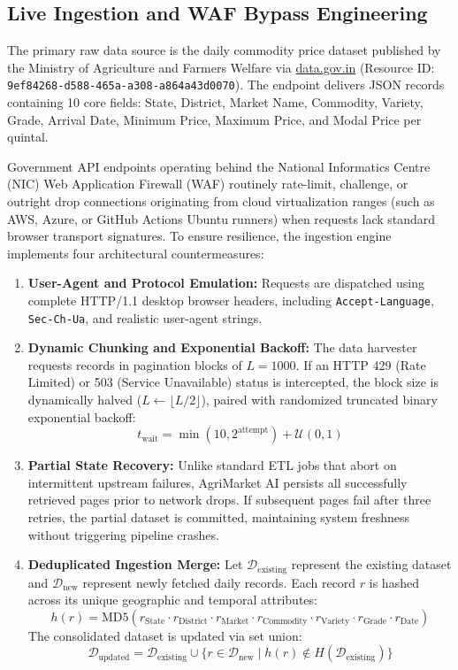 \documentclass[conference]{IEEEtran}
\begin{document}
\subsection{Live Ingestion and WAF Bypass Engineering}
The primary raw data source is the daily commodity price dataset published by the Ministry of Agriculture and Farmers Welfare via \url{data.gov.in} (Resource ID: \texttt{9ef84268-d588-465a-a308-a864a43d0070}). The endpoint delivers JSON records containing 10 core fields: State, District, Market Name, Commodity, Variety, Grade, Arrival Date, Minimum Price, Maximum Price, and Modal Price per quintal.

Government API endpoints operating behind the National Informatics Centre (NIC) Web Application Firewall (WAF) routinely rate-limit, challenge, or outright drop connections originating from cloud virtualization ranges (such as AWS, Azure, or GitHub Actions Ubuntu runners) when requests lack standard browser transport signatures. To ensure resilience, the ingestion engine implements four architectural countermeasures:
\begin{enumerate}
    \item \textbf{User-Agent and Protocol Emulation:} Requests are dispatched using complete HTTP/1.1 desktop browser headers, including \texttt{Accept-Language}, \texttt{Sec-Ch-Ua}, and realistic user-agent strings.
    \item \textbf{Dynamic Chunking and Exponential Backoff:} The data harvester requests records in pagination blocks of $L = 1000$. If an HTTP 429 (Rate Limited) or 503 (Service Unavailable) status is intercepted, the block size is dynamically halved ($L \leftarrow \lfloor L/2 \rfloor$), paired with randomized truncated binary exponential backoff:
    \begin{equation}
    t_{\text{wait}} = \min(10, 2^{\text{attempt}}) + \mathcal{U}(0, 1)
    \end{equation}
    \item \textbf{Partial State Recovery:} Unlike standard ETL jobs that abort on intermittent upstream failures, AgriMarket AI persists all successfully retrieved pages prior to network drops. If subsequent pages fail after three retries, the partial dataset is committed, maintaining system freshness without triggering pipeline crashes.
    \item \textbf{Deduplicated Ingestion Merge:} Let $\mathcal{D}_{\text{existing}}$ represent the existing dataset and $\mathcal{D}_{\text{new}}$ represent newly fetched daily records. Each record $r$ is hashed across its unique geographic and temporal attributes:
    \begin{equation}
    h(r) = \text{MD5}(r_{\text{State}} \cdot r_{\text{District}} \cdot r_{\text{Market}} \cdot r_{\text{Commodity}} \cdot r_{\text{Variety}} \cdot r_{\text{Grade}} \cdot r_{\text{Date}})
    \end{equation}
    The consolidated dataset is updated via set union:
    \begin{equation}
    \mathcal{D}_{\text{updated}} = \mathcal{D}_{\text{existing}} \cup \{ r \in \mathcal{D}_{\text{new}} \mid h(r) \notin H(\mathcal{D}_{\text{existing}}) \}
    \end{equation}
\end{enumerate}
\end{document}

